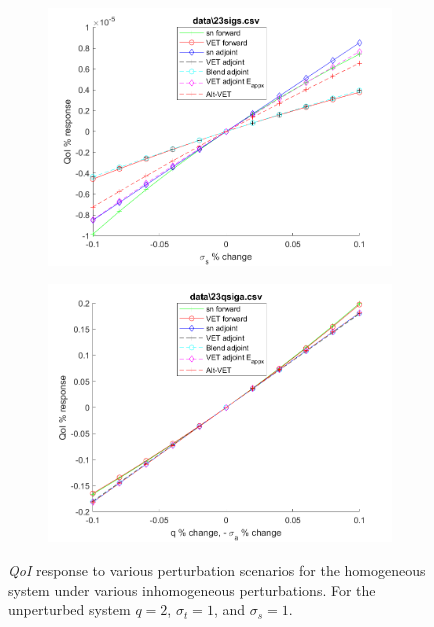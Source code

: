 \documentclass[12pt]{report}
\newcommand{\sigt}{\sigma_t}
\newcommand{\sigs}{\sigma_s}
\newcommand{\qoi}{{\it QoI}\xspace}
\begin{document}
\begin{figure}[H]
\begin{subfigure}{.5\textwidth}
  \includegraphics[width=.98\linewidth]{figures2/23sigsSens.png}
  \label{T2:sfig3}
\end{subfigure}%
\begin{subfigure}{.5\textwidth}
  \centering
  \includegraphics[width=.98\linewidth]{figures2/23qsigaSens.png}
  \label{T2:sfig4}
\end{subfigure}
\caption{\qoi response to various perturbation scenarios for the homogeneous system under various inhomogeneous perturbations. For the unperturbed system $q=2$, $\sigt=1$, and $\sigs=1$.}
\end{figure}
\end{document}
